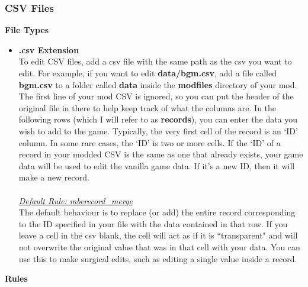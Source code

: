 \documentclass{article}
\begin{document}
\subsubsection{CSV Files}
\textbf{File Types}
\begin{itemize}
\item \textbf{.csv Extension}\\
To edit CSV files, add a csv file with the same path as the csv you want to edit. For example, if you want to edit \textbf{data/bgm.csv}, add a file called \textbf{bgm.csv} to a folder called \textbf{data} inside the \textbf{modfiles} directory of your mod. The first line of your mod CSV is ignored, so you can put the header of the original file in there to help keep track of what the columns are. In the following rows (which I will refer to as \textbf{records}), you can enter the data you wish to add to the game. Typically, the very first cell of the record is an `ID' column. In some rare cases, the `ID' is two or more cells. If the `ID' of a record in your modded CSV is the same as one that already exists, your game data will be used to edit the vanilla game data. If it's a new ID, then it will make a new record.\\\\
\underline{\textit{Default Rule: mberecord\_merge}}\\
The default behaviour is to replace (or add) the entire record corresponding to the ID specified in your file with the data contained in that row. If you leave a cell in the csv blank, the cell will act as if it is ``transparent" and will not overwrite the original value that was in that cell with your data. You can use this to make surgical edits, such as editing a single value inside a record.
\end{itemize}
\textbf{Rules}
\end{document}
